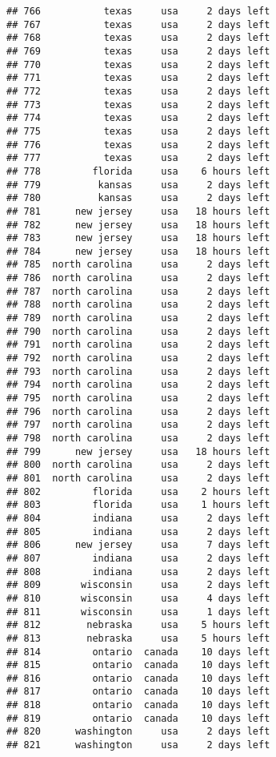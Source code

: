 \documentclass[
]{article}
\begin{document}
\begin{verbatim}
## 766           texas     usa     2 days left
## 767           texas     usa     2 days left
## 768           texas     usa     2 days left
## 769           texas     usa     2 days left
## 770           texas     usa     2 days left
## 771           texas     usa     2 days left
## 772           texas     usa     2 days left
## 773           texas     usa     2 days left
## 774           texas     usa     2 days left
## 775           texas     usa     2 days left
## 776           texas     usa     2 days left
## 777           texas     usa     2 days left
## 778         florida     usa    6 hours left
## 779          kansas     usa     2 days left
## 780          kansas     usa     2 days left
## 781      new jersey     usa   18 hours left
## 782      new jersey     usa   18 hours left
## 783      new jersey     usa   18 hours left
## 784      new jersey     usa   18 hours left
## 785  north carolina     usa     2 days left
## 786  north carolina     usa     2 days left
## 787  north carolina     usa     2 days left
## 788  north carolina     usa     2 days left
## 789  north carolina     usa     2 days left
## 790  north carolina     usa     2 days left
## 791  north carolina     usa     2 days left
## 792  north carolina     usa     2 days left
## 793  north carolina     usa     2 days left
## 794  north carolina     usa     2 days left
## 795  north carolina     usa     2 days left
## 796  north carolina     usa     2 days left
## 797  north carolina     usa     2 days left
## 798  north carolina     usa     2 days left
## 799      new jersey     usa   18 hours left
## 800  north carolina     usa     2 days left
## 801  north carolina     usa     2 days left
## 802         florida     usa    2 hours left
## 803         florida     usa    1 hours left
## 804         indiana     usa     2 days left
## 805         indiana     usa     2 days left
## 806      new jersey     usa     7 days left
## 807         indiana     usa     2 days left
## 808         indiana     usa     2 days left
## 809       wisconsin     usa     2 days left
## 810       wisconsin     usa     4 days left
## 811       wisconsin     usa     1 days left
## 812        nebraska     usa    5 hours left
## 813        nebraska     usa    5 hours left
## 814         ontario  canada    10 days left
## 815         ontario  canada    10 days left
## 816         ontario  canada    10 days left
## 817         ontario  canada    10 days left
## 818         ontario  canada    10 days left
## 819         ontario  canada    10 days left
## 820      washington     usa     2 days left
## 821      washington     usa     2 days left

\end{verbatim}
\end{document}
